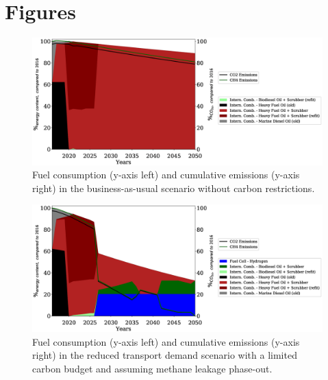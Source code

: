 \documentclass[article]{elsarticle}
\begin{document}
\clearpage
\section{Figures}
\begin{figure}[h]
    \centering
    \includegraphics[width=\textwidth]{figures/BAU_fuels_emissions.eps}
    \caption{Fuel consumption (y-axis left) and cumulative emissions (y-axis right) in the business-as-usual scenario without carbon restrictions.}
    \label{fig:BAU}
\end{figure}
\begin{figure}[h]
    \centering
    \includegraphics[width=\textwidth]{figures/TDVAR_fuels_emissions.eps}
    \caption{Fuel consumption (y-axis left) and cumulative emissions (y-axis right) in the reduced transport demand scenario with a limited carbon budget and assuming methane leakage phase-out.}
    \label{fig:TDV}
\end{figure}
\end{document}
